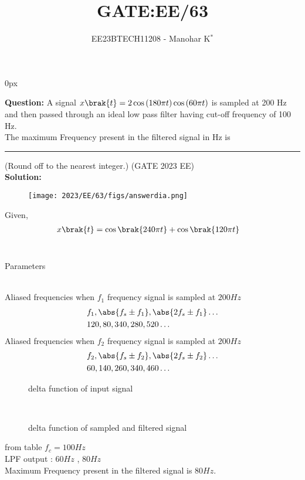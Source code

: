 \documentclass[journal,12pt,twocolumn]{IEEEtran}
\begin{document}
	\parindent 0px
	
	
	\vspace{3cm}
	
	\title{GATE:EE/63}
	\author{EE23BTECH11208 - Manohar K$^{*}$
	}
	\maketitle
	\newpage
	\bigskip
	
	
	
	
	\textbf{Question:} \hspace{2pt} A signal $x\brak{t}=2\cos{(180\pi t)}\cos{(60\pi t)}$ is sampled at 200 Hz and then passed through an ideal low pass filter having cut-off frequency of 100 Hz.\\
	The maximum Frequency present in the filtered  signal in Hz is \rule{1cm}{0.5mm} (Round off to the nearest integer.) \hfill (GATE 2023 EE)\\
	\noindent \textbf{Solution:}\\
	\fi
	\begin{figure}[ht]
		\centering
		\texttt{[image: 2023/EE/63/figs/answerdia.png]}
	\end{figure}
	Given, \\
	
	\begin{align}
		x\brak{t}&=\cos\brak{240\pi t} + \cos\brak{120\pi t}
	\end{align}\\
	\begin{table}[h]
		\centering
		
		\caption{Parameters}
		\label{tab:GATE.EE.2023.63}
	\end{table}\\
	Aliased frequencies when $f_1$ frequency signal is sampled at $200Hz$\\
	\begin{align}
		& f_1 , \abs{f_s\pm f_1} , \abs{2f_s \pm f_1} \dots\\
		& 120, 80,340,280,520 \dots
	\end{align}
	Aliased frequencies when $f_2$ frequency signal is sampled at $200Hz$\\
	\begin{align}
		& f_2 , \abs{f_s\pm f_2} , \abs{2f_s\pm f_2} \dots\\
		& 60 , 140,260,340,460 \dots 
	\end{align}
\begin{figure}
	\centering
	
	\caption{delta function of input signal }
\end{figure}\\
	
	
\begin{figure}
	\centering
	
	\caption{delta function of sampled and filtered signal }
\end{figure}
	from table $f_c = 100Hz$ \\
	LPF output : $60Hz$ , $80Hz$\\
	Maximum Frequency present in the filtered signal is $80Hz$.
	
	
	
	
\end{document}
